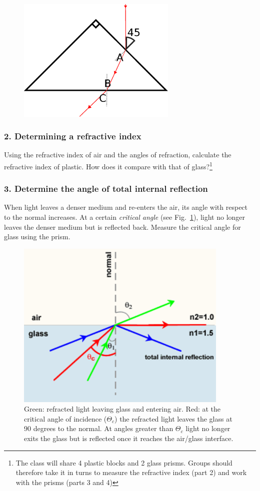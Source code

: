 \documentclass[a4paper]{report}
\begin{document}
\begin{figure}[h]
\center
\includegraphics[width=3in]{prism.eps}
\end{figure}

\subsubsection{2. Determining a refractive index}
Using the refractive index of air and the angles of refraction,
calculate the refractive index of plastic. How does it compare with
that of glass?\footnote{The class will share 4 plastic blocks
  and 2 glass prisms. Groups should therefore take it in turns to
  measure the refractive index (part 2) and work with the prisms
  (parts 3 and 4)}

\subsubsection{3. Determine the angle of total internal reflection}
When light leaves a denser medium and re-enters the air, its angle
with respect to the normal increases. At a certain \textit{critical
  angle} (see Fig.~\ref{TIR}), light no longer leaves the denser
medium but is reflected back. Measure the critical angle for glass
using the prism. 

\begin{figure}[h]
\center
\includegraphics[width=4in]{total-internal-reflection.eps}
\caption{Green: refracted light leaving glass and entering air. Red:
  at the critical angle of incidence ($\Theta_c$) the refracted light
  leaves the glass at 90 degrees to the normal. At angles greater than
$\Theta_c$ light no longer exits the glass but is reflected once it
  reaches the air/glass interface.}
\label{TIR}
\end{figure}
\end{document}

